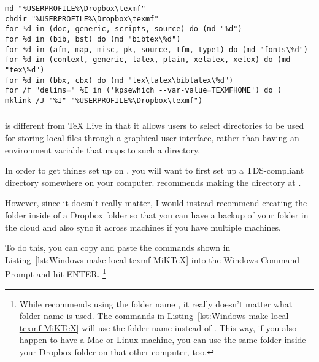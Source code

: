 \begin{listing}[htbp]
	\centering
	\begin{verbatim}
md "%USERPROFILE%\Dropbox\texmf"
chdir "%USERPROFILE%\Dropbox\texmf"
for %d in (doc, generic, scripts, source) do (md "%d")
for %d in (bib, bst) do (md "bibtex\%d")
for %d in (afm, map, misc, pk, source, tfm, type1) do (md "fonts\%d")
for %d in (context, generic, latex, plain, xelatex, xetex) do (md "tex\%d")
for %d in (bbx, cbx) do (md "tex\latex\biblatex\%d")
for /f "delims=" %I in ('kpsewhich --var-value=TEXMFHOME') do (
mklink /J "%I" "%USERPROFILE%\Dropbox\texmf")
	\end{verbatim}
	\caption{Make a TDS-compliant directory in Dropbox and symlink it into TEXMFHOME on Windows}
	\label{lst:Windows-make-TEXMFHOME-in-Dropbox}
\end{listing}

\subsubsection{}
\label{subsubsec:local-files:miktex}

 is different from TeX Live in that it allows users to select directories to be used for storing local files through a graphical user interface, rather than having an environment variable that maps to such a directory.

In order to get things set up on , you will want to first set up a TDS-compliant directory somewhere on your computer.
 recommends making the directory at .

However, since it doesn't really matter, I would instead recommend creating the  folder inside of a Dropbox folder so that you can have a backup of your  folder in the cloud and also sync it across machines if you have multiple machines.

To do this, you can copy and paste the commands shown in Listing~\ref{lst:Windows-make-local-texmf-MiKTeX} into the Windows Command Prompt and hit ENTER.%
\footnote{%
While  recommends using the folder name , it really doesn't matter what folder name is used.
The commands in Listing~\ref{lst:Windows-make-local-texmf-MiKTeX} will use the folder name  instead of .
This way, if you also happen to have a Mac or Linux machine, you can use the same folder inside your Dropbox folder on that other computer, too.%
}

